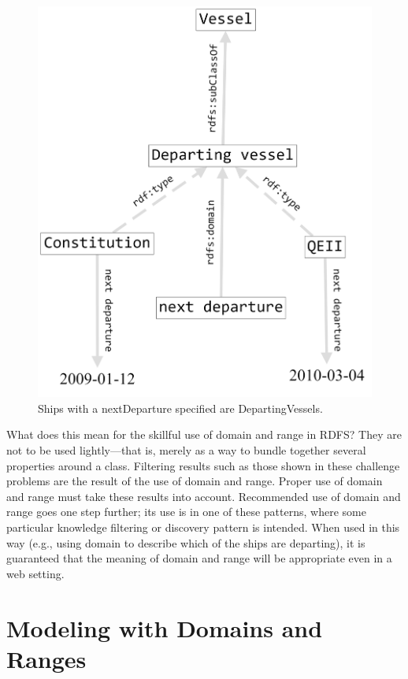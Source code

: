 \begin{figure}
\centering
\includegraphics[width=5in]{SWWOv3/media/ch8/figure8-5.png}
\caption{Ships with a nextDeparture specified are DepartingVessels.}
\label{fig:ch8.5}
\end{figure}





What does this mean for the skillful use of domain and range in RDFS?
They are not to be used lightly---that is, merely as a way to bundle
together several properties around a class. Filtering results such as
those shown in these challenge problems are the result of the use of
domain and range. Proper use of domain and range must take these results
into account. Recommended use of domain and range goes one step further;
its use is in one of these patterns, where some particular knowledge
filtering or discovery pattern is intended. When used in this way (e.g.,
using domain to describe which of the ships are departing), it is
guaranteed that the meaning of domain and range will be appropriate even
in a web setting.

\section{Modeling with Domains and Ranges}

